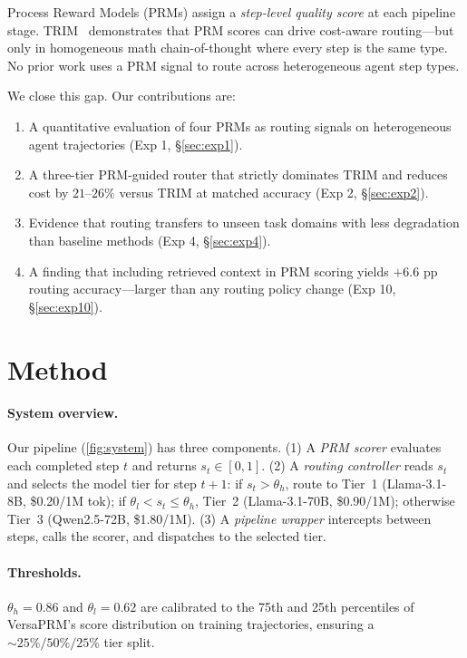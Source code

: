 \documentclass[sigconf,natbib=false]{acmart}
\begin{document}
Process Reward Models (PRMs) assign a \emph{step-level quality score} at each
pipeline stage.  TRIM~\cite{trim2026} demonstrates that PRM scores can drive
cost-aware routing---but only in homogeneous math chain-of-thought where every
step is the same type.  No prior work uses a PRM signal to route across
heterogeneous agent step types.

We close this gap.  Our contributions are:
\begin{enumerate}[leftmargin=*,topsep=2pt]
  \item A quantitative evaluation of four PRMs as routing signals on
    heterogeneous agent trajectories (Exp 1, \S\ref{sec:exp1}).
  \item A three-tier PRM-guided router that strictly dominates TRIM and
    reduces cost by $21$--$26\%$ versus TRIM at matched accuracy (Exp 2,
    \S\ref{sec:exp2}).
  \item Evidence that routing transfers to unseen task domains with less
    degradation than baseline methods (Exp 4, \S\ref{sec:exp4}).
  \item A finding that including retrieved context in PRM scoring yields
    $+6.6$ pp routing accuracy---larger than any routing policy change
    (Exp 10, \S\ref{sec:exp10}).
\end{enumerate}

\section{Method}
\label{sec:method}

\paragraph{System overview.}
Our pipeline (\cref{fig:system}) has three components.  (1) A \emph{PRM
scorer} evaluates each completed step $t$ and returns $s_t \in [0,1]$.
(2) A \emph{routing controller} reads $s_t$ and selects the model tier for
step $t{+}1$: if $s_t > \theta_h$, route to Tier~1 (Llama-3.1-8B,
\$0.20/1M tok); if $\theta_l < s_t \leq \theta_h$, Tier~2
(Llama-3.1-70B, \$0.90/1M); otherwise Tier~3 (Qwen2.5-72B, \$1.80/1M).
(3) A \emph{pipeline wrapper} intercepts between steps, calls the scorer, and
dispatches to the selected tier.

\paragraph{Thresholds.}
$\theta_h = 0.86$ and $\theta_l = 0.62$ are calibrated to the 75th and 25th
percentiles of VersaPRM's score distribution on training trajectories, ensuring
a ${\sim}25\%/50\%/25\%$ tier split.
\end{document}
